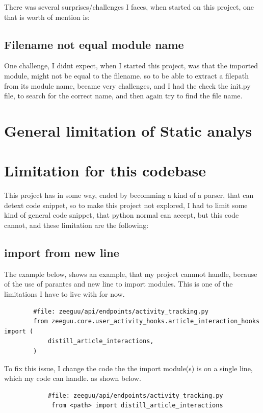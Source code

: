 \documentclass[12pt,a4paper]{report}
\begin{document}
    There was several surprises/challenges I faces, when started on this project, one that is worth of mention is: 

    \subsection{Filename not equal module name}
    One challenge, I didnt expect, when I started this project, was that the imported module, might not be equal to the filename. 
    so to be able to extract a filepath from its module name, became very challenges, and I had the check the init.py file, to search for the correct name, and then again try to find the file name. 

    \section{General limitation of Static analys}

    \section{Limitation for this codebase}
    This project has in some way, ended by becomming a kind of a parser, that can detext code snippet, so to make this project not explored, I had to limit some kind of general code snippet, that python normal can accept, but this code cannot, and these limitation are the following: 

    \subsection{import from new line}
    The example below, shows an example, that my project cannnot handle, because of the use of parantes and new line to import modules. This is one of the limitations I have to live with for now.

    \begin{lstlisting}
        #file: zeeguu/api/endpoints/activity_tracking.py
        from zeeguu.core.user_activity_hooks.article_interaction_hooks import (
            distill_article_interactions,
        )
        \end{lstlisting}


    To fix this issue, I change the code the the import module(s) is on a single line, which my code can handle. as shown below. 

        \begin{lstlisting}
            #file: zeeguu/api/endpoints/activity_tracking.py
             from <path> import distill_article_interactions
        \end{lstlisting}
    
\end{document}
